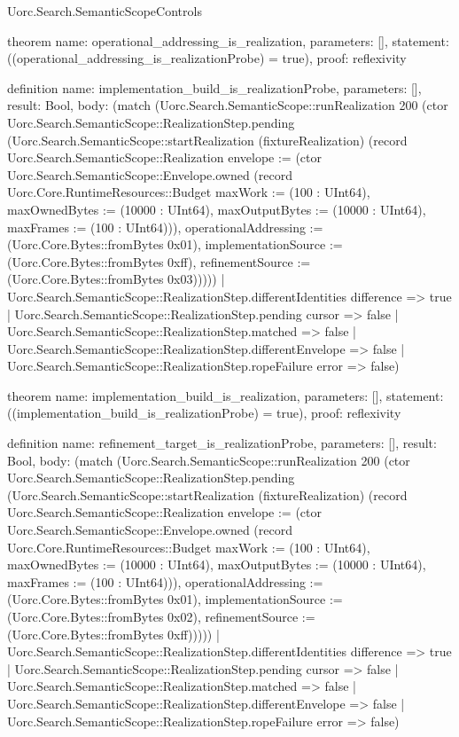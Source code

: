 \begin{lexlean}{Uorc.Search.SemanticScopeControls}
\begin{semanticmodule}
theorem{
  name: operational_addressing_is_realization,
  parameters: [],
  statement: ((operational_addressing_is_realizationProbe) = true),
  proof: reflexivity{}
}

definition{
  name: implementation_build_is_realizationProbe,
  parameters: [],
  result: Bool,
  body: (match (Uorc.Search.SemanticScope::runRealization 200 (ctor Uorc.Search.SemanticScope::RealizationStep.pending (Uorc.Search.SemanticScope::startRealization (fixtureRealization) (record Uorc.Search.SemanticScope::Realization {envelope := (ctor Uorc.Search.SemanticScope::Envelope.owned (record Uorc.Core.RuntimeResources::Budget {maxWork := (100 : UInt64), maxOwnedBytes := (10000 : UInt64), maxOutputBytes := (10000 : UInt64), maxFrames := (100 : UInt64)})), operationalAddressing := (Uorc.Core.Bytes::fromBytes 0x01), implementationSource := (Uorc.Core.Bytes::fromBytes 0xff), refinementSource := (Uorc.Core.Bytes::fromBytes 0x03)}))))
    | Uorc.Search.SemanticScope::RealizationStep.differentIdentities difference => true
    | Uorc.Search.SemanticScope::RealizationStep.pending cursor => false
    | Uorc.Search.SemanticScope::RealizationStep.matched => false
    | Uorc.Search.SemanticScope::RealizationStep.differentEnvelope => false
    | Uorc.Search.SemanticScope::RealizationStep.ropeFailure error => false)
}

theorem{
  name: implementation_build_is_realization,
  parameters: [],
  statement: ((implementation_build_is_realizationProbe) = true),
  proof: reflexivity{}
}

definition{
  name: refinement_target_is_realizationProbe,
  parameters: [],
  result: Bool,
  body: (match (Uorc.Search.SemanticScope::runRealization 200 (ctor Uorc.Search.SemanticScope::RealizationStep.pending (Uorc.Search.SemanticScope::startRealization (fixtureRealization) (record Uorc.Search.SemanticScope::Realization {envelope := (ctor Uorc.Search.SemanticScope::Envelope.owned (record Uorc.Core.RuntimeResources::Budget {maxWork := (100 : UInt64), maxOwnedBytes := (10000 : UInt64), maxOutputBytes := (10000 : UInt64), maxFrames := (100 : UInt64)})), operationalAddressing := (Uorc.Core.Bytes::fromBytes 0x01), implementationSource := (Uorc.Core.Bytes::fromBytes 0x02), refinementSource := (Uorc.Core.Bytes::fromBytes 0xff)}))))
    | Uorc.Search.SemanticScope::RealizationStep.differentIdentities difference => true
    | Uorc.Search.SemanticScope::RealizationStep.pending cursor => false
    | Uorc.Search.SemanticScope::RealizationStep.matched => false
    | Uorc.Search.SemanticScope::RealizationStep.differentEnvelope => false
    | Uorc.Search.SemanticScope::RealizationStep.ropeFailure error => false)
}


\end{semanticmodule}
\end{lexlean}
